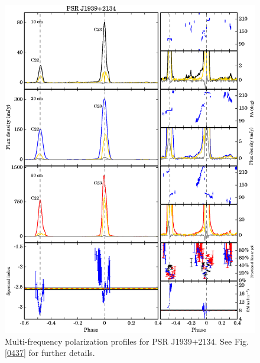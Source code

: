 \documentclass[useAMS,usenatbib]{mn2e}
\begin{document}
\begin{appendices}
\begin{figure}
\begin{center}
\includegraphics[width=6 in]{1939.ps}
\caption{Multi-frequency polarization profiles for PSR J1939$+$2134. 
See Fig. \ref{0437} for further details.}
\label{1939}
\end{center}
\end{figure}


\end{appendices}
\end{document}
